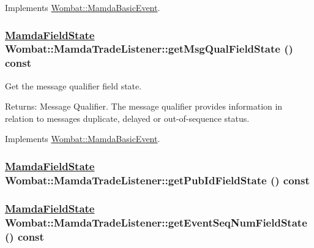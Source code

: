 Implements \hyperlink{classWombat_1_1MamdaBasicEvent_418ecb29b412cd42581b54c87b5360fd}{Wombat::Mamda\-Basic\-Event}.\hypertarget{classWombat_1_1MamdaTradeListener_415c8f22e03ada875aeb985455d8fc92}{
\subsubsection[getMsgQualFieldState]{\setlength{\rightskip}{0pt plus 5cm}\hyperlink{namespaceWombat_93aac974f2ab713554fd12a1fa3b7d2a}{Mamda\-Field\-State} Wombat::Mamda\-Trade\-Listener::get\-Msg\-Qual\-Field\-State () const}}
\label{classWombat_1_1MamdaTradeListener_415c8f22e03ada875aeb985455d8fc92}


Get the message qualifier field state. 

\begin{Desc}
\item[Returns:]Message Qualifier. The message qualifier provides information in relation to messages duplicate, delayed or out-of-sequence status. \end{Desc}


Implements \hyperlink{classWombat_1_1MamdaBasicEvent_3454d51e1131d9949691ee4b4153cd97}{Wombat::Mamda\-Basic\-Event}.\hypertarget{classWombat_1_1MamdaTradeListener_e3cb9fc3b97c1e3e33392db6221e45ec}{
\subsubsection[getPubIdFieldState]{\setlength{\rightskip}{0pt plus 5cm}\hyperlink{namespaceWombat_93aac974f2ab713554fd12a1fa3b7d2a}{Mamda\-Field\-State} Wombat::Mamda\-Trade\-Listener::get\-Pub\-Id\-Field\-State () const}}
\label{classWombat_1_1MamdaTradeListener_e3cb9fc3b97c1e3e33392db6221e45ec}


\hypertarget{classWombat_1_1MamdaTradeListener_22fb35889eb20ecd6e52d01d5227a74c}{
\subsubsection[getEventSeqNumFieldState]{\setlength{\rightskip}{0pt plus 5cm}\hyperlink{namespaceWombat_93aac974f2ab713554fd12a1fa3b7d2a}{Mamda\-Field\-State} Wombat::Mamda\-Trade\-Listener::get\-Event\-Seq\-Num\-Field\-State () const}}
\label{classWombat_1_1MamdaTradeListener_22fb35889eb20ecd6e52d01d5227a74c}


